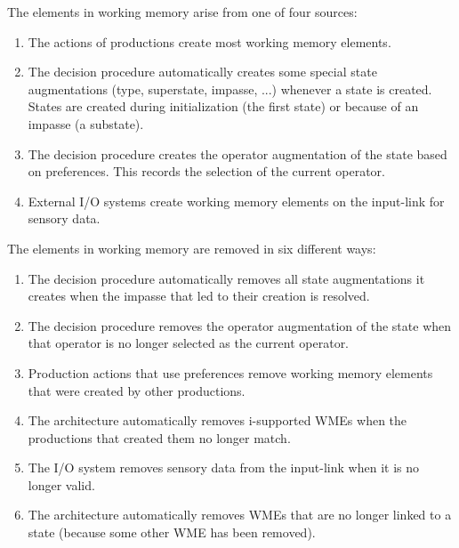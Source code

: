 The elements in working memory arise from one of four sources:\vspace{-12pt}
\begin{enumerate}
\item The actions of productions create most working memory elements. 
\vspace{-8pt}
\item The decision procedure automatically creates some special 
   state augmentations (type, superstate, impasse, ...)
	whenever a state is created.  States are created during 
	initialization (the first state) or because of an impasse (a 
substate).  \vspace{-8pt}
\item The decision procedure creates the operator augmentation of the state 
based on
preferences.  This records the selection of the current operator.\vspace{-8pt}
\item External I/O systems create working memory elements on the input-link
for sensory data.
\end{enumerate}

The elements in working memory are removed in six different ways:\vspace{-12pt}
\begin{enumerate}
\item The decision procedure automatically removes all state
augmentations it creates when the impasse that led to their creation is 
resolved.\vspace{-8pt}
\item The decision procedure removes the operator augmentation of the
state when that operator is no longer selected as the current operator.\vspace{-
8pt}
\item Production actions that use  preferences remove
      working memory elements that were created by other productions.\vspace{-8pt}
\item The architecture automatically removes i-supported WMEs when the productions that created them no longer match.\vspace{-8pt}
\item The I/O system removes sensory data from the input-link when it
is no longer valid. \vspace{-8pt}
\item The architecture automatically removes WMEs that are no longer linked to 
a state (because some other WME has been removed).
\end{enumerate}


